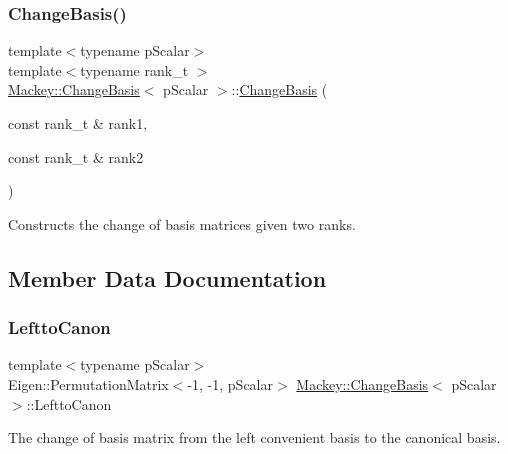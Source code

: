 \subsubsection{\texorpdfstring{Change\+Basis()}{ChangeBasis()}\hspace{0.1cm}{\footnotesize\ttfamily [2/2]}}
{\footnotesize\ttfamily template$<$typename p\+Scalar$>$ \\
template$<$typename rank\+\_\+t $>$ \\
\hyperlink{classMackey_1_1ChangeBasis}{Mackey\+::\+Change\+Basis}$<$ p\+Scalar $>$\+::\hyperlink{classMackey_1_1ChangeBasis}{Change\+Basis} (\begin{DoxyParamCaption}\item[{const rank\+\_\+t \&}]{rank1,  }\item[{const rank\+\_\+t \&}]{rank2 }\end{DoxyParamCaption})\hspace{0.3cm}{\ttfamily [inline]}}



Constructs the change of basis matrices given two ranks. 



\subsection{Member Data Documentation}
\mbox{\label{classMackey_1_1ChangeBasis_a784f69cb8de92e84fef755461c60d3d0}} 
\subsubsection{\texorpdfstring{Leftto\+Canon}{LefttoCanon}}
{\footnotesize\ttfamily template$<$typename p\+Scalar$>$ \\
Eigen\+::\+Permutation\+Matrix$<$-\/1, -\/1, p\+Scalar$>$ \hyperlink{classMackey_1_1ChangeBasis}{Mackey\+::\+Change\+Basis}$<$ p\+Scalar $>$\+::Leftto\+Canon}



The change of basis matrix from the left convenient basis to the canonical basis. 

\mbox{\label{classMackey_1_1ChangeBasis_aa169c2e7937437ea2102de1c3072194c}} 
